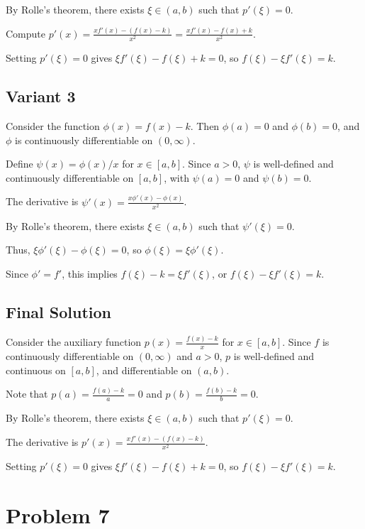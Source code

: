 \documentclass[12pt,a4paper]{article}
\theoremstyle{definition}
\begin{document}
    By Rolle's theorem, there exists $\xi \in (a, b)$ such that $p'(\xi) = 0$.

    Compute $p'(x) = \frac{x f'(x) - (f(x) - k)}{x^2} = \frac{x f'(x) - f(x) + k}{x^2}$.

    Setting $p'(\xi) = 0$ gives $\xi f'(\xi) - f(\xi) + k = 0$, so $f(\xi) - \xi f'(\xi) = k$.


\subsection{Variant 3}
    Consider the function $\phi(x) = f(x) - k$. Then $\phi(a) = 0$ and $\phi(b) = 0$, and $\phi$ is continuously differentiable on $(0, \infty)$.

    Define $\psi(x) = \phi(x)/x$ for $x \in [a, b]$. Since $a > 0$, $\psi$ is well-defined and continuously differentiable on $[a, b]$, with $\psi(a) = 0$ and $\psi(b) = 0$.

    The derivative is $\psi'(x) = \frac{x \phi'(x) - \phi(x)}{x^2}$.

    By Rolle's theorem, there exists $\xi \in (a, b)$ such that $\psi'(\xi) = 0$.

    Thus, $\xi \phi'(\xi) - \phi(\xi) = 0$, so $\phi(\xi) = \xi \phi'(\xi)$.

    Since $\phi' = f'$, this implies $f(\xi) - k = \xi f'(\xi)$, or $f(\xi) - \xi f'(\xi) = k$.

\subsection{Final Solution}
    Consider the auxiliary function $p(x) = \frac{f(x) - k}{x}$ for $x \in [a, b]$. Since $f$ is continuously differentiable on $(0, \infty)$ and $a > 0$, $p$ is well-defined and continuous on $[a, b]$, and differentiable on $(a, b)$.

    Note that $p(a) = \frac{f(a) - k}{a} = 0$ and $p(b) = \frac{f(b) - k}{b} = 0$.

    By Rolle's theorem, there exists $\xi \in (a, b)$ such that $p'(\xi) = 0$.

    The derivative is $p'(x) = \frac{x f'(x) - (f(x) - k)}{x^2}$.

    Setting $p'(\xi) = 0$ gives $\xi f'(\xi) - f(\xi) + k = 0$, so $f(\xi) - \xi f'(\xi) = k$.

  \section{Problem 7}
\end{document}
